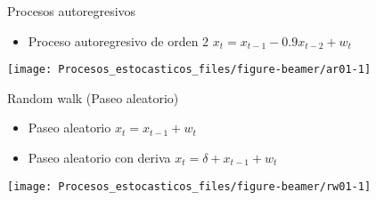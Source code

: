 \documentclass[ignorenonframetext,]{beamer}
\providecommand{\tightlist}{%
  \setlength{\itemsep}{0pt}\setlength{\parskip}{0pt}}
\begin{document}
\begin{frame}{Procesos autoregresivos}

\begin{itemize}
\tightlist
\item
  Proceso autoregresivo de orden 2 \(x_t = x_{t-1} - 0.9x_{t-2} + w_t\)
\end{itemize}

\begin{center}\texttt{[image: Procesos\_estocasticos\_files/figure-beamer/ar01-1]} \end{center}

\end{frame}

\begin{frame}{Random walk (Paseo aleatorio)}

\begin{itemize}
\item
  Paseo aleatorio \(x_t = x_{t-1} + w_t\)
\item
  Paseo aleatorio con deriva \(x_t = \delta+ x_{t-1} + w_t\)
\end{itemize}

\begin{center}\texttt{[image: Procesos\_estocasticos\_files/figure-beamer/rw01-1]} \end{center}

\end{frame}
\end{document}
